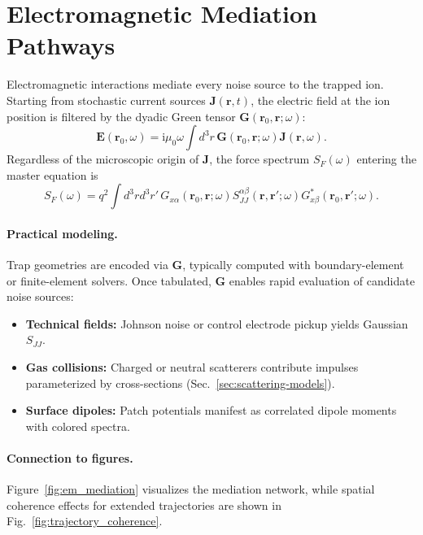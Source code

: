 \section{Electromagnetic Mediation Pathways}
Electromagnetic interactions mediate every noise source to the trapped ion.
Starting from stochastic current sources $\mathbf{J}(\mathbf{r},t)$, the electric field at the ion position is filtered by the dyadic Green tensor $\mathbf{G}(\mathbf{r}_0,\mathbf{r};\omega)$:
\begin{equation}
\mathbf{E}(\mathbf{r}_0,\omega) = \mathrm{i}\mu_0\omega \int d^3 r\, \mathbf{G}(\mathbf{r}_0,\mathbf{r};\omega) \mathbf{J}(\mathbf{r},\omega).
\end{equation}
Regardless of the microscopic origin of $\mathbf{J}$, the force spectrum $S_F(\omega)$ entering the master equation is
\begin{equation}
S_F(\omega) = q^2 \int d^3 r d^3 r'\, G_{x\alpha}(\mathbf{r}_0,\mathbf{r};\omega) S_{JJ}^{\alpha\beta}(\mathbf{r},\mathbf{r}';\omega) G^{*}_{x\beta}(\mathbf{r}_0,\mathbf{r}';\omega).
\end{equation}

\paragraph{Practical modeling.}
Trap geometries are encoded via $\mathbf{G}$, typically computed with boundary-element or finite-element solvers.
Once tabulated, $\mathbf{G}$ enables rapid evaluation of candidate noise sources:
\begin{itemize}
  \item \textbf{Technical fields:} Johnson noise or control electrode pickup yields Gaussian $S_{JJ}$.
  \item \textbf{Gas collisions:} Charged or neutral scatterers contribute impulses parameterized by cross-sections (Sec.~\ref{sec:scattering-models}).
  \item \textbf{Surface dipoles:} Patch potentials manifest as correlated dipole moments with colored spectra.
\end{itemize}

\paragraph{Connection to figures.}
Figure~\ref{fig:em_mediation} visualizes the mediation network, while spatial coherence effects for extended trajectories are shown in Fig.~\ref{fig:trajectory_coherence}.
